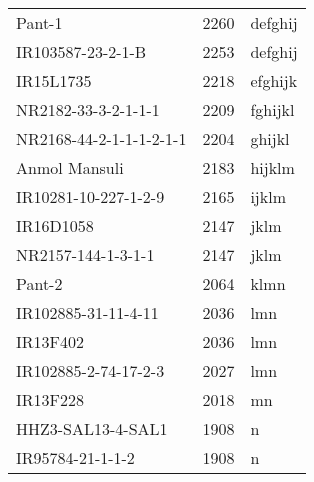 \documentclass[]{article}
\begin{document}
\begin{longtable}{lll}
Pant-1 & 2260 & defghij\\
\rowcolor{gray!6}  IR103587-23-2-1-B & 2253 & defghij\\
IR15L1735 & 2218 & efghijk\\
\addlinespace
\rowcolor{gray!6}  NR2182-33-3-2-1-1-1 & 2209 & fghijkl\\
NR2168-44-2-1-1-1-2-1-1 & 2204 & ghijkl\\
\rowcolor{gray!6}  Anmol Mansuli & 2183 & hijklm\\
IR10281-10-227-1-2-9 & 2165 & ijklm\\
\rowcolor{gray!6}  IR16D1058 & 2147 & jklm\\
\addlinespace
NR2157-144-1-3-1-1 & 2147 & jklm\\
\rowcolor{gray!6}  Pant-2 & 2064 & klmn\\
IR102885-31-11-4-11 & 2036 & lmn\\
\rowcolor{gray!6}  IR13F402 & 2036 & lmn\\
IR102885-2-74-17-2-3 & 2027 & lmn\\
\addlinespace
\rowcolor{gray!6}  IR13F228 & 2018 & mn\\
HHZ3-SAL13-4-SAL1 & 1908 & n\\
\rowcolor{gray!6}  IR95784-21-1-1-2 & 1908 & n\\
\bottomrule
\end{longtable}

\endgroup{}
\begingroup\fontsize{12}{14}\selectfont
\end{document}
